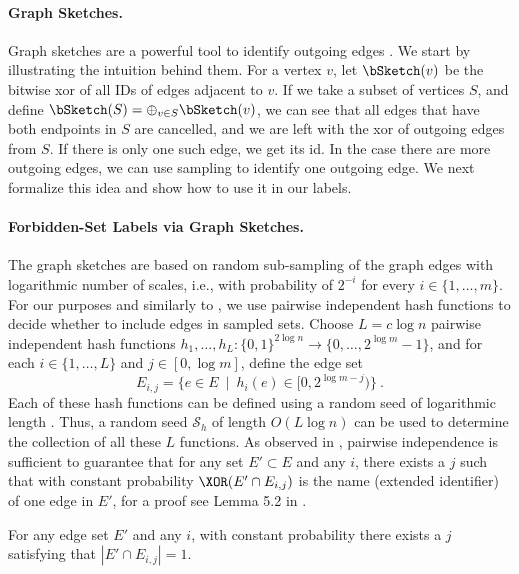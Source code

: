 \paragraph{Graph Sketches.}
Graph sketches are a powerful tool to identify outgoing edges \cite{kapron2013dynamic,ahn2012analyzing}.  We start by illustrating the intuition behind them. For a vertex $v$, let $\bSketch(v)$ be the bitwise xor of all IDs of edges adjacent to $v$. If we take a subset of vertices $S$, and define  $\bSketch(S) = \oplus_{v \in S} \bSketch(v)$, we can see that all edges that have both endpoints in $S$ are cancelled, and we are left with the xor of outgoing edges from $S$. If there is only one such edge, we get its id. In the case there are more outgoing edges, we can use sampling to identify one outgoing edge. We next formalize this idea and show how to use it in our labels. 

\paragraph{Forbidden-Set Labels via Graph Sketches.} 
The graph sketches are based on random sub-sampling of the graph edges with logarithmic number of scales, i.e., with probability of $2^{-i}$ for every $i \in \{1,\ldots, m\}$. For our purposes and similarly to \cite{DuanConnectivityArxiv16,DuanConnectivitySODA17}, we use pairwise independent hash functions to decide whether to include edges in sampled sets. Choose $L=c\log n$ 
pairwise independent hash functions $h_1, \ldots, h_{L}:\{0,1\}^{2\log n} \to \{0, \ldots, 2^{\log m}-1\}$, and for each $i \in \{1, \ldots, L\}$ and $j \in [0,\log m]$, define the edge set 
$$E_{i,j} =\{ e \in E ~\mid~ h_i(e) \in [0,2^{\log m-j})\}~.$$ 
Each of these hash functions can be defined using a random seed of logarithmic length \cite{TCS-010}. Thus, a 
random seed $\mathcal{S}_h$ of length $O(L \log n)$ can be used to determine the collection of all these $L$ functions. As observed in \cite{DuanConnectivityArxiv16,GibbKKT15}, pairwise independence is sufficient to guarantee that for any set $E' \subset E$ and any $i$, there exists a $j$ such that with constant probability $\XOR(E' \cap E_{i,j})$ is the name (extended identifier) of one edge in $E'$, for a proof see Lemma 5.2 in  \cite{GibbKKT15}.
\begin{lemma}\label{lem:hitting-pairwise}
For any edge set $E'$ and any $i$, with constant probability there exists a $j$ satisfying that $|E' \cap E_{i,j}|=1$.
\end{lemma}


